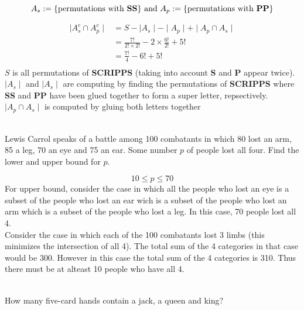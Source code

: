 \documentclass[12pt,letterpaper,boxed]{hmcpset}
\begin{document}
\begin{solution}%
\[
A_s:= \{ \text{permutations with \textbf{SS}} \} \text{ and }\\
A_p:= \{ \text{permutations with \textbf{PP}} \}
\]

\begin{align*}
\mid A_s^c \cap A_p^c \mid &= S - \mid A_s \mid- \mid A_p \mid+ \mid A_p \cap A_s \mid\\
&=\frac{7!}{2! \times 2!} - 2 \times \frac{6!}{2!} + 5!\\
&= \boxed{\frac{7!}{4} - 6! + 5!}\\
\end{align*}
$S$ is all permutations of \textbf{SCRIPPS} (taking into account \textbf{S} and \textbf{P} appear twice). $\mid A_s \mid$ and $\mid A_s \mid$ are computing by finding the permutations of \textbf{SCRIPPS} where \textbf{SS} and \textbf{PP} have been glued together to form a super letter, repsectively.  $ \mid A_p \cap A_s \mid$ is computed by gluing both letters together
\end{solution}


\begin{problem}[Shahriari 8.1.8][20]\\
Lewis Carrol speaks of a battle among 100 combatants in which 80 lost an arm, 85 a leg, 70 an eye and 75 an ear. Some number $p$ of people lost all four. Find the lower and upper bound for $p$.
\end{problem}

\begin{solution}
$$10 \leq p \leq 70$$
For upper bound, consider the case in which all the people who lost an eye is a subset of the people who lost an ear wich is a subset of the people who lost an arm which is a subset of the people who lost a leg. In this case, 70 people lost all 4.\\
Consider the case in which each of the 100 combatants lost 3 limbs (this minimizes the intersection of all 4). The total sum of the 4 categories in that case would be 300. However in this case the total sum of the 4 categories is 310. Thus there must be at alteast 10 people who have all 4.
\end{solution}

\begin{problem}[Shahriari 8.1.10][20]\\
How many five-card hands contain a jack, a queen and king?
\end{problem}
\end{document}
